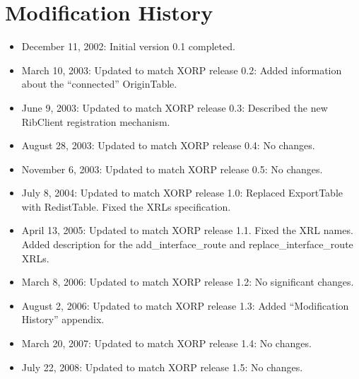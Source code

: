 \documentclass[11pt]{article}
\begin{document}
\section{Modification History}

\begin{itemize}

  \item December 11, 2002: Initial version 0.1 completed.

  \item March 10, 2003: Updated to match XORP release 0.2:
   Added information about the ``connected'' OriginTable.

  \item June 9, 2003: Updated to match XORP release 0.3:
   Described the new RibClient registration mechanism.

  \item August 28, 2003: Updated to match XORP release 0.4:
   No changes.

  \item November 6, 2003: Updated to match XORP release 0.5:
   No changes.

  \item July 8, 2004: Updated to match XORP release 1.0:
   Replaced ExportTable with RedistTable. Fixed the XRLs specification.

  \item April 13, 2005: Updated to match XORP release 1.1.
   Fixed the XRL names. Added description for the add\_interface\_route and
   replace\_interface\_route XRLs.

  \item March 8, 2006: Updated to match XORP release 1.2:
   No significant changes.

  \item August 2, 2006: Updated to match XORP release 1.3:
   Added ``Modification History'' appendix.

  \item March 20, 2007: Updated to match XORP release 1.4:
   No changes.

  \item July 22, 2008: Updated to match XORP release 1.5:
   No changes.

\end{itemize}




\end{document}
